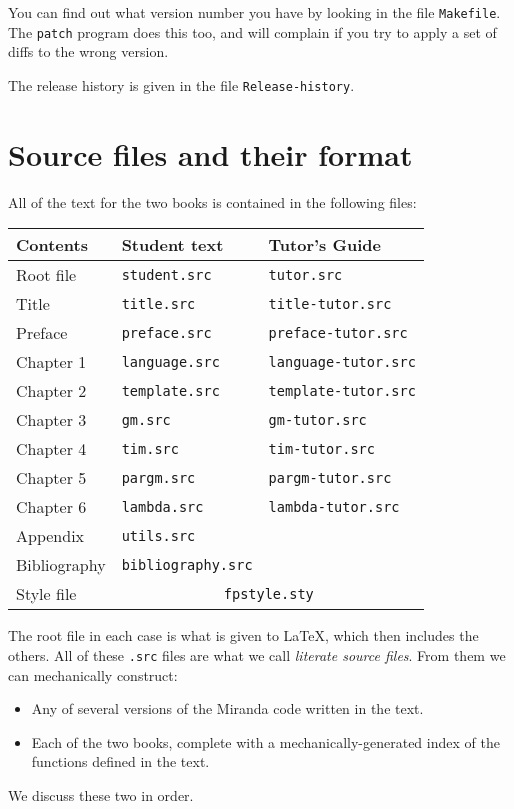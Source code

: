 You can find out what version number you have by looking in 
the file \mbox{\tt Makefile}.
The \mbox{\tt patch} program does this too, and will complain if you try to
apply a set of diffs to the wrong version.

The release history is given in the file \mbox{\tt Release-history}.

\chapter{Source files and their format}

All of the text for the two books is contained in the following files:
\begin{center}
\begin{tabular}{|lll|}
\hline 
Contents        & Student text          & Tutor's Guide \\
\hline
Root file       & \mbox{\tt student.src}         & \mbox{\tt tutor.src} \\
Title           & \mbox{\tt title.src}           & \mbox{\tt title-tutor.src} \\
Preface         & \mbox{\tt preface.src}         & \mbox{\tt preface-tutor.src} \\
Chapter 1       & \mbox{\tt language.src}        & \mbox{\tt language-tutor.src} \\
Chapter 2       & \mbox{\tt template.src}        & \mbox{\tt template-tutor.src} \\
Chapter 3       & \mbox{\tt gm.src}              & \mbox{\tt gm-tutor.src} \\
Chapter 4       & \mbox{\tt tim.src}             & \mbox{\tt tim-tutor.src} \\
Chapter 5       & \mbox{\tt pargm.src}           & \mbox{\tt pargm-tutor.src} \\
Chapter 6       & \mbox{\tt lambda.src}          & \mbox{\tt lambda-tutor.src} \\
Appendix        & \mbox{\tt utils.src}           & \\
Bibliography    & \mbox{\tt bibliography.src}    & \\
Style file      & \multicolumn{2}{c}{\mbox{\tt fpstyle.sty}} \\
\hline
\end{tabular}
\end{center}
The root file in each case is what is given to \LaTeX{}, which then includes
the others.
All of these \mbox{\tt .src} files are what we call {\em literate source files}.
From them we can mechanically construct:
\begin{itemize}
\item
Any of several versions of the Miranda code 
written in the text.
\item
Each of the two books, complete with a mechanically-generated index of
the functions defined in the text.
\end{itemize}
We discuss these two in order.

